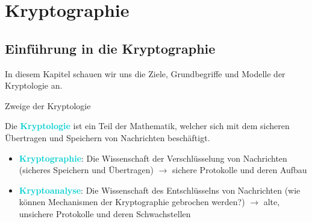 \section{Kryptographie}

\subsection{Einführung in die Kryptographie}

\begin{remark}
    In diesem Kapitel schauen wir uns die Ziele, Grundbegriffe und Modelle der Kryptologie an.
\end{remark}

\begin{concept}{Zweige der Kryptologie}
    
    Die \textcolor{darkturquoise}{\textbf{Kryptologie}} ist ein Teil der Mathematik, welcher sich mit dem sicheren Übertragen und Speichern von Nachrichten beschäftigt.

    \begin{itemize}
        \item \textcolor{darkturquoise}{\textbf{Kryptographie}}: Die Wissenschaft der Verschlüsselung von Nachrichten (sicheres Speichern und Übertragen) $\rightarrow$ sichere Protokolle und deren Aufbau
        \item \textcolor{darkturquoise}{\textbf{Kryptoanalyse}}: Die Wissenschaft des Entschlüsselns von Nachrichten (wie können Mechanismen der Kryptographie gebrochen werden?) $\rightarrow$ alte, unsichere Protokolle und deren Schwachstellen
    \end{itemize}
\end{concept}


